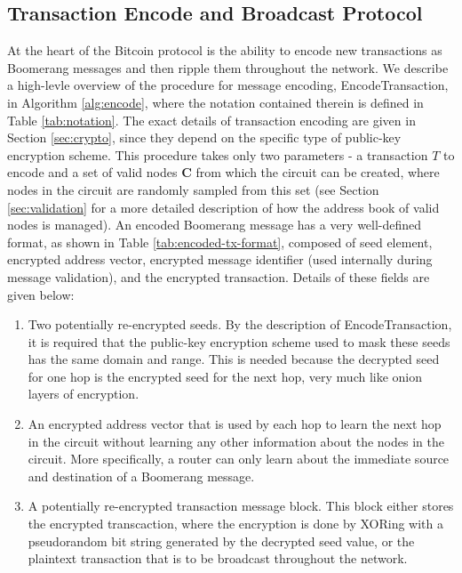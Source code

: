 \subsection{Transaction Encode and Broadcast Protocol} \label{sec:broadcast-protocol}

At the heart of the Bitcoin protocol is the ability to encode new transactions as Boomerang messages and then ripple them throughout the network. We describe a high-levle overview of the procedure for message encoding, {\sf EncodeTransaction}, in Algorithm \ref{alg:encode}, where the notation contained therein is defined in Table \ref{tab:notation}. The exact details of transaction encoding are given in Section \ref{sec:crypto}, since they depend on the specific type of public-key encryption scheme. This procedure takes only two parameters - a transaction $T$ to encode and a set of valid nodes $\mathbf{C}$ from which the circuit can be created, where nodes in the circuit are randomly sampled from this set (see Section \ref{sec:validation} for a more detailed description of how the address book of valid nodes is managed). An encoded Boomerang message has a very well-defined format, as shown in Table \ref{tab:encoded-tx-format}, composed of seed element, encrypted address vector, encrypted message identifier (used internally during message validation), and the encrypted transaction. Details of these fields are given below:
\begin{enumerate}
	\item Two potentially re-encrypted seeds. By the description of {\sf EncodeTransaction}, it is required that the public-key encryption scheme used to mask these seeds has the same domain and range. This is needed because the decrypted seed for one hop is the encrypted seed for the next hop, very much like onion layers of encryption.
	\item An encrypted address vector that is used by each hop to learn the next hop in the circuit without learning any other information about the nodes in the circuit. More specifically, a router can only learn about the immediate source and destination of a Boomerang message.
	\item A potentially re-encrypted transaction message block. This block either stores the encrypted transcaction, where the encryption is done by XORing with a pseudorandom bit string generated by the decrypted seed value, or the plaintext transaction that is to be broadcast throughout the network.
\end{enumerate}

